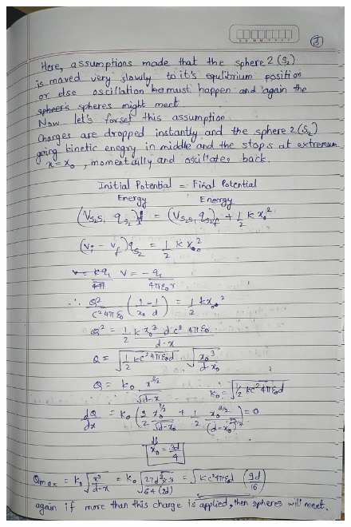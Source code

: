 \documentclass{article}
\begin{document}
\begin{figure}[H]
    \centering
    \includegraphics[width=\textwidth]{figs/written/3.jpg}
\end{figure}
\end{document}
